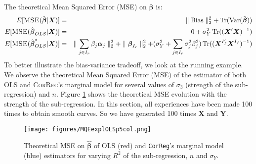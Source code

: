 \documentclass[12pt,a4paper]{report}
\begin{document}
		  
	 The theoretical Mean Squared Error (\textsc{MSE}) on $\hat{\boldsymbol{\beta}}$ is:
	\begin{eqnarray}
		E[\textsc{MSE}(\hat{\boldsymbol{\beta}}|\boldsymbol{X})]&=&\parallel \operatorname{Bias}\parallel_2^2+\operatorname{Tr}(\operatorname{Var}(\hat{\boldsymbol{\beta}})) \\
			E[\textsc{MSE}(\hat{\boldsymbol{\beta}}_{OLS}|\boldsymbol{X})]&=& 0 + \sigma_Y^2 \operatorname{Tr}((\boldsymbol{X}'\boldsymbol{X})^{-1}) %
			 \\
			E[\textsc{MSE}(\hat{\boldsymbol{\beta}}^*_{OLS}|\boldsymbol{X})]&=& \parallel\sum_{j \in I_r}\beta_{j}\boldsymbol{\alpha}_j \parallel_2^2 +\parallel \boldsymbol{\beta}_{I_r}\parallel^2_2 + (\sigma^2_Y+\sum_{j \in I_r}\sigma^2_{j}\beta_{j}^2 ) \operatorname{Tr}((\boldsymbol{X}^{I_f'} \boldsymbol{X}^{I_f})^{-1})
	\end{eqnarray}	 
	To better illustrate the bias-variance tradeoff, we look at the running example. We observe the theoretical Mean Squared Error (MSE) of the estimator of both OLS and \textsc{CorReg}'s marginal  model for several values of $\sigma_3$ (strength of the sub-regression) and $n$. Figure \ref{MQEexplOLSp5col} shows the theoretical MSE evolution with the strength of the sub-regression. In this section, all experiences have been made 100 times to obtain smooth curves. So we have generated 100 times $\boldsymbol{X}$ and $\boldsymbol{Y}$.
\begin{figure}[h!]
	\texttt{[image: figures/MQEexplOLSp5col.png]}\label{MQEexplOLSp5col}
	\caption{Theoretical MSE on $\hat{\boldsymbol{\beta}}$ of OLS (red) and {\tt CorReg}'s marginal model (blue) estimators for varying $R^2$ of the sub-regression, $n$ and $\sigma_Y$.}
\end{figure} 
\end{document}
